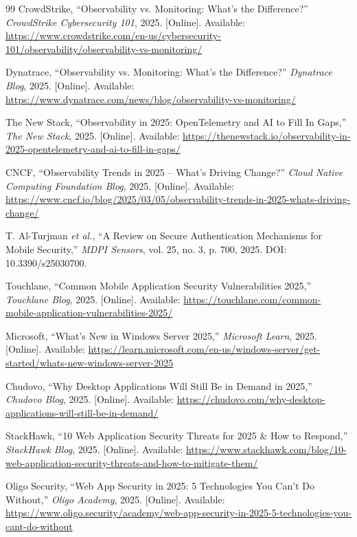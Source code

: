 \documentclass[12pt, a4paper]{article}
\begin{document}
\begin{thebibliography}{99}
CrowdStrike, ``Observability vs. Monitoring: What's the Difference?''
\textit{CrowdStrike Cybersecurity 101}, 2025. [Online]. Available:
\url{https://www.crowdstrike.com/en-us/cybersecurity-101/observability/observability-vs-monitoring/}

Dynatrace, ``Observability vs. Monitoring: What's the Difference?''
\textit{Dynatrace Blog}, 2025. [Online]. Available:
\url{https://www.dynatrace.com/news/blog/observability-vs-monitoring/}

The New Stack, ``Observability in 2025: OpenTelemetry and AI to Fill In
Gaps,'' \textit{The New Stack}, 2025. [Online]. Available:
\url{https://thenewstack.io/observability-in-2025-opentelemetry-and-ai-to-fill-in-gaps/}

CNCF, ``Observability Trends in 2025 -- What's Driving Change?''
\textit{Cloud Native Computing Foundation Blog}, 2025. [Online]. Available:
\url{https://www.cncf.io/blog/2025/03/05/observability-trends-in-2025-whats-driving-change/}

T. Al-Turjman \textit{et al.}, ``A Review on Secure Authentication
Mechanisms for Mobile Security,'' \textit{MDPI Sensors}, vol. 25, no. 3,
p. 700, 2025. DOI: 10.3390/s25030700.

Touchlane, ``Common Mobile Application Security Vulnerabilities 2025,''
\textit{Touchlane Blog}, 2025. [Online]. Available:
\url{https://touchlane.com/common-mobile-application-vulnerabilities-2025/}

Microsoft, ``What's New in Windows Server 2025,'' \textit{Microsoft Learn},
2025. [Online]. Available:
\url{https://learn.microsoft.com/en-us/windows-server/get-started/whats-new-windows-server-2025}

Chudovo, ``Why Desktop Applications Will Still Be in Demand in 2025,''
\textit{Chudovo Blog}, 2025. [Online]. Available:
\url{https://chudovo.com/why-desktop-applications-will-still-be-in-demand/}

StackHawk, ``10 Web Application Security Threats for 2025 \& How to
Respond,'' \textit{StackHawk Blog}, 2025. [Online]. Available:
\url{https://www.stackhawk.com/blog/10-web-application-security-threats-and-how-to-mitigate-them/}

Oligo Security, ``Web App Security in 2025: 5 Technologies You Can't Do
Without,'' \textit{Oligo Academy}, 2025. [Online]. Available:
\url{https://www.oligo.security/academy/web-app-security-in-2025-5-technologies-you-cant-do-without}


\end{thebibliography}
\end{document}

